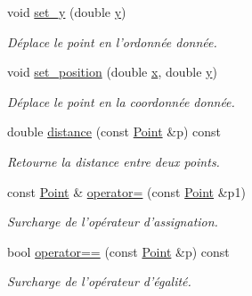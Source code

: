 \begin{DoxyCompactItemize}
void \hyperlink{classPoint_a44bf07535f5dd99991a274833462379b}{set\+\_\+y} (double \hyperlink{classPoint_a96e90df6b3c18e64c31abdf196e49ae9}{y})
\begin{DoxyCompactList}\small\item\em Déplace le point en l'ordonnée donnée. \end{DoxyCompactList}\item 
void \hyperlink{classPoint_ad41fea4a6458fd82d9055b45d0a3c030}{set\+\_\+position} (double \hyperlink{classPoint_a3eef47b1c4849b3395a8f9c658ca7c4a}{x}, double \hyperlink{classPoint_a96e90df6b3c18e64c31abdf196e49ae9}{y})
\begin{DoxyCompactList}\small\item\em Déplace le point en la coordonnée donnée. \end{DoxyCompactList}\item 
double \hyperlink{classPoint_a61651e744a578356e2296e7935e858d7}{distance} (const \hyperlink{classPoint}{Point} \&p) const 
\begin{DoxyCompactList}\small\item\em Retourne la distance entre deux points. \end{DoxyCompactList}\item 
const \hyperlink{classPoint}{Point} \& \hyperlink{classPoint_a1436b60e581a48190621810f2a4d29cb}{operator=} (const \hyperlink{classPoint}{Point} \&p1)
\begin{DoxyCompactList}\small\item\em Surcharge de l'opérateur d'assignation. \end{DoxyCompactList}\item 
bool \hyperlink{classPoint_a2a6b68cd301437368de443687fc2a9f1}{operator==} (const \hyperlink{classPoint}{Point} \&p) const 
\begin{DoxyCompactList}\small\item\em Surcharge de l'opérateur d'égalité. \end{DoxyCompactList}\end{DoxyCompactItemize}
